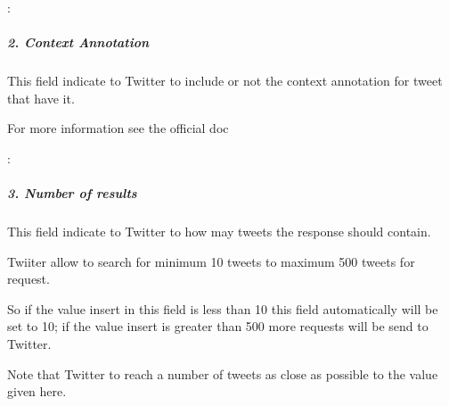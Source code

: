 \documentclass[letterpaper,10pt,english]{sphinxmanual}
\begin{document}
\begin{DUlineblock}{0em}
\item[] : 
\end{DUlineblock}


\subparagraph{2. Context Annotation}
\label{\detokenize{guide/tweet_search_guide:context-annotation}}
\begin{sphinxVerbatim}[commandchars=\\\{\}]
 
\end{sphinxVerbatim}

\begin{DUlineblock}{0em}
\item[] This field indicate to Twitter to include or not the context annotation for tweet that have it.
\item[] For more information see the official doc 
\end{DUlineblock}

\sphinxAtStartPar
{}: 


\subparagraph{3. Number of results}
\label{\detokenize{guide/tweet_search_guide:number-of-results}}
\begin{sphinxVerbatim}[commandchars=\\\{\}]
 
\end{sphinxVerbatim}

\begin{DUlineblock}{0em}
\item[] This field indicate to Twitter to how may tweets the response should contain.
\item[] Twiiter allow to search for minimum 10 tweets to maximum 500 tweets for request.
\item[] So if the value insert in this field is less than 10 this field automatically will be set to 10; if the value insert is greater than 500 more requests will be send to Twitter.
\item[] Note that Twitter to reach a number of tweets as close as possible to the value given here.
\end{DUlineblock}
\end{document}
